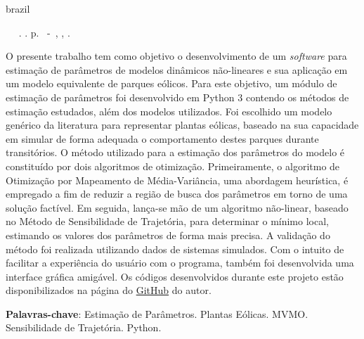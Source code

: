 \setlength{\absparsep}{18pt} %

\begin{resumo}[Resumo]

\begin{otherlanguage*}{brazil}

\begin{flushleft} 
	\setlength{\absparsep}{0pt} %
	\SingleSpacing 
	\imprimirautorabr~ ~\textbf{\imprimirtitleabstract}.	\imprimirdata. \pageref{LastPage}p. 
	\imprimirtipotrabalho~-~\imprimirinstituicao, \imprimirlocal, \imprimirdata. 
\end{flushleft}

\OnehalfSpacing

O presente trabalho tem como objetivo o desenvolvimento de um \textit{software} para estima\c{c}\~ao de par\^ametros de modelos din\^amicos n\~ao-lineares e sua aplica\c{c}\~ao em um modelo equivalente de parques e\'olicos. Para este objetivo, um m\'odulo de estima\c{c}\~ao de par\^ametros foi desenvolvido em Python 3 contendo os m\'etodos de estima\c{c}\~ao estudados, al\'em dos modelos utilizados. Foi escolhido um modelo gen\'erico da literatura para representar plantas e\'olicas, baseado na sua capacidade em simular de forma adequada o comportamento destes parques durante transit\'orios. O m\'etodo utilizado para a estima\c{c}\~ao dos par\^ametros do modelo \'e constitu\'ido por dois algoritmos de otimiza\c{c}\~ao. Primeiramente, o algoritmo de Otimiza\c{c}\~ao por Mapeamento de M\'edia-Vari\^ancia, uma abordagem heur\'istica, \'e empregado a fim de reduzir a regi\~ao de busca dos par\^ametros em torno de uma solu\c{c}\~ao fact\'ivel. Em seguida, lan\c{c}a-se m\~ao de um algoritmo n\~ao-linear, baseado no M\'etodo de Sensibilidade de Trajet\'oria, para determinar o m\'inimo local, estimando os valores dos par\^ametros de forma mais precisa. A valida\c{c}\~ao do m\'etodo foi realizada utilizando dados de sistemas simulados. Com o intuito de facilitar a experi\^encia do usu\'ario com o programa, tamb\'em foi desenvolvida uma interface gr\'afica amig\'avel. Os c\'odigos desenvolvidos durante este projeto est\~ao disponibilizados na p\'agina do \href{https://github.com/gnegrelli}{GitHub} do autor.

\textbf{Palavras-chave}: Estima\c{c}\~ao de Par\^ametros. Plantas E\'olicas. MVMO. Sensibilidade de Trajet\'oria. Python.

\end{otherlanguage*}

\end{resumo}